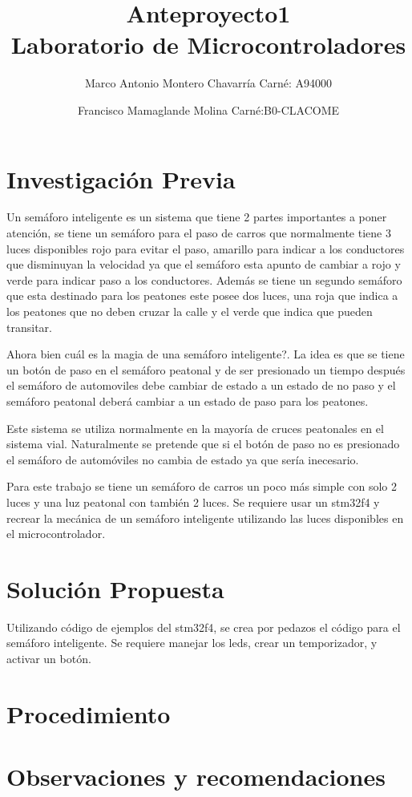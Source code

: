 \documentclass[letterpaper]{article}
\begin{document}
\title{Anteproyecto1\\Laboratorio de Microcontroladores}
\author{
 Marco Antonio Montero Chavarría Carné: A94000\\
  \and
  Francisco Mamaglande Molina Carné:B0-CLACOME\\  
}
\maketitle

\section{Investigación Previa}
Un semáforo inteligente es un sistema que tiene 2 partes importantes a poner atención, se tiene
un semáforo para el paso de carros que normalmente tiene 3 luces disponibles rojo para evitar el paso,
amarillo para indicar a los conductores que disminuyan la velocidad ya que el semáforo esta apunto de cambiar a rojo
y verde para indicar paso a los conductores. Además se tiene un segundo semáforo que esta destinado para los peatones
este posee dos luces, una roja que indica a los peatones que no deben cruzar la calle y el verde que indica que pueden
transitar.

Ahora bien cuál es la magia de una semáforo inteligente?. La idea es que se tiene un botón de paso en el semáforo
peatonal y de ser presionado un tiempo después el semáforo de automoviles debe cambiar de estado a un estado de no paso
y el semáforo peatonal deberá cambiar a un estado de paso para los peatones.

Este sistema se utiliza normalmente en la mayoría de cruces peatonales en el sistema vial. Naturalmente se pretende
que si el botón de paso no es presionado el semáforo de automóviles no cambia de estado ya que sería inecesario.

Para este trabajo se tiene un semáforo de carros un poco más simple con solo 2 luces y una luz peatonal con también 2 luces.
Se requiere usar un stm32f4 y recrear la mecánica de un semáforo inteligente utilizando las luces disponibles en el microcontrolador.


\section{Solución Propuesta}
Utilizando código de ejemplos del stm32f4, se crea por pedazos el código para el semáforo inteligente. Se requiere manejar 
los leds, crear un temporizador, y activar un botón.


\section{Procedimiento}

\section{Observaciones y recomendaciones}

 

\end{document}
